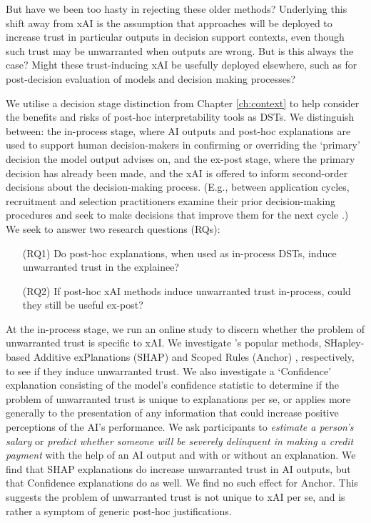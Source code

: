 But have we been too hasty in rejecting these older methods? Underlying this shift away from xAI is the assumption that approaches will be deployed to increase trust in particular outputs in decision support contexts, even though such trust may be unwarranted when outputs are wrong. But is this always the case? Might these trust-inducing xAI be usefully deployed elsewhere, such as for post-decision evaluation of models and decision making processes?

We utilise a decision stage distinction from Chapter \ref{ch:context} to help consider the benefits and risks of post-hoc interpretability tools as DSTs. We distinguish between: the in-process stage, where AI outputs and post-hoc explanations are used to support human decision-makers in confirming or overriding the `primary' decision the model output advises on, and the ex-post stage, where the primary decision has already been made, and the xAI is offered to inform second-order decisions about the decision-making process. (E.g., between application cycles, recruitment and selection practitioners examine their prior decision-making procedures and seek to make decisions that improve them for the next cycle \cite{li2020hiring}.) We seek to answer two research questions (RQs):

\begin{enumerate}
    \item[(RQ1)] Do post-hoc explanations, when used as in-process DSTs, induce unwarranted trust in the explainee?
    \item[(RQ2)] If post-hoc xAI methods induce unwarranted trust in-process, could they still be useful ex-post?
\end{enumerate}

At the in-process stage, we run an online study to discern whether the problem of unwarranted trust is specific to xAI. We investigate \textcite{lundberg_unified_2017,ribeiro_anchors_2018}'s popular methods, SHapley-based Additive exPlanations (SHAP) \cite{lundberg_unified_2017} and Scoped Rules (Anchor) \cite{ribeiro_anchors_2018}, respectively, to see if they induce unwarranted trust. We also investigate a `Confidence' explanation consisting of the model's confidence statistic to determine if the problem of unwarranted trust is unique to explanations per se, or applies more generally to the presentation of any information that could increase positive perceptions of the AI's performance. We ask participants to \emph{estimate a person's salary} \cite{kohavi_scaling_1996} or \emph{predict whether someone will be severely delinquent in making a credit payment} \cite{GiveMeSomeCredit} with the help of an AI output and with or without an explanation. We find that SHAP explanations do increase unwarranted trust in AI outputs, but that Confidence explanations do as well. We find no such effect for Anchor. This suggests the problem of unwarranted trust is not unique to xAI per se, and is rather a symptom of generic post-hoc justifications.

